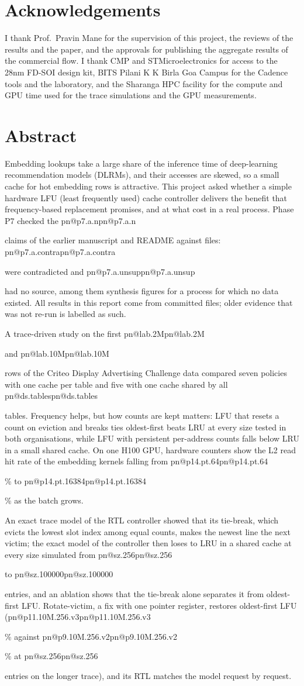 \documentclass[11pt,a4paper]{report}
\makeatletter
\DeclareRobustCommand{\R}[1]{\ifcsname pn@#1\endcsname\csname pn@#1\endcsname\else
  \PackageError{report}{number key '#1' is not defined in macros.tex}{Run tools/make_paper_macros.py --target report}\fi}
\makeatother
\begin{document}
\chapter*{Acknowledgements}
I thank Prof.\ Pravin Mane for the supervision of this project, the reviews of the results and the paper, and the approvals for publishing the aggregate results of the commercial flow. I thank CMP and STMicroelectronics for access to the 28nm
FD-SOI design kit, BITS Pilani K K Birla Goa Campus for the Cadence tools and the laboratory, and the Sharanga HPC
facility for the compute and GPU time used for the trace simulations and the GPU measurements.

\chapter*{Abstract}
Embedding lookups take a large share of the inference time of deep-learning recommendation models (DLRMs), and their
accesses are skewed, so a small cache for hot embedding rows is attractive. This project asked whether a simple
hardware LFU (least frequently used) cache controller delivers the benefit that frequency-based replacement promises,
and at what cost in a real process. Phase P7 checked the \R{p7.a.n} claims of the earlier manuscript and README against files: \R{p7.a.contra} were contradicted and \R{p7.a.unsup} had no source, among them synthesis figures for a process for which no data existed. All results in this report come from committed files; older evidence that was not re-run is labelled as such.

A trace-driven study on the first \R{lab.2M} and \R{lab.10M} rows of the Criteo Display Advertising Challenge data
compared seven policies with one cache per table and five with one cache shared by all \R{ds.tables} tables. Frequency
helps, but how counts are kept matters: LFU that resets a count on eviction and breaks ties oldest-first beats LRU at every size tested in both organisations, while LFU with persistent per-address counts falls below LRU in a small shared cache. On one H100 GPU,
hardware counters show the L2 read hit rate of the embedding kernels falling from \R{p14.pt.64}\% to
\R{p14.pt.16384}\% as the batch grows.

An exact trace model of the RTL controller showed that its tie-break, which evicts the lowest slot index among equal
counts, makes the newest line the next victim; the exact model of the controller then loses to LRU in a shared cache at every size simulated from \R{sz.256} to \R{sz.100000} entries, and an ablation shows that the tie-break alone separates it from oldest-first LFU. Rotate-victim, a fix with one pointer register, restores oldest-first LFU (\R{p11.10M.256.v3}\% against
\R{p9.10M.256.v2}\% at \R{sz.256} entries on the longer trace), and its RTL matches the model request by request.
\end{document}
